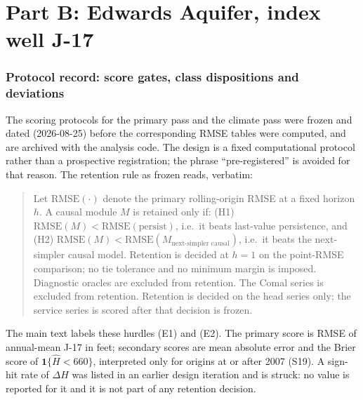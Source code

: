 \FloatBarrier
\part*{Part B: Edwards Aquifer, index well J-17}

\section{Protocol record: score gates, class dispositions and deviations}\label{si:edwprotocol}

The scoring protocols for the primary pass and the climate pass were frozen and dated (2026-08-25) before the corresponding RMSE tables were computed, and are archived with the analysis code. The design is a fixed computational protocol rather than a prospective registration; the phrase ``pre-registered'' is avoided for that reason. The retention rule as frozen reads, verbatim:

\begin{quote}\small
Let $\mathrm{RMSE}(\cdot)$ denote the primary rolling-origin RMSE at a fixed horizon $h$. A causal module $M$ is retained only if: (H1) $\mathrm{RMSE}(M) < \mathrm{RMSE}(\text{persist})$, i.e.\ it beats last-value persistence, and (H2) $\mathrm{RMSE}(M) < \mathrm{RMSE}(M_{\text{next-simpler causal}})$, i.e.\ it beats the next-simpler causal model. Retention is decided at $h=1$ on the point-RMSE comparison; no tie tolerance and no minimum margin is imposed. Diagnostic oracles are excluded from retention. The Comal series is excluded from retention. Retention is decided on the head series only; the service series is scored after that decision is frozen.
\end{quote}

The main text labels these hurdles (E1) and (E2). The primary score is RMSE of annual-mean J-17 in feet; secondary scores are mean absolute error and the Brier score of $\mathbf{1}\{\hat H<660\}$, interpreted only for origins at or after 2007 (S19). A sign-hit rate of $\Delta H$ was listed in an earlier design iteration and is struck: no value is reported for it and it is not part of any retention decision.

